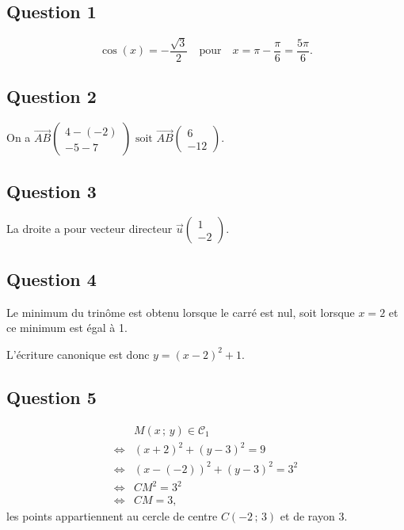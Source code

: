 \subsection*{Question 1}

\[
\cos(x) = -\dfrac{\sqrt{3}}{2} \quad \text{pour} \quad x = \pi - \dfrac{\pi}{6} = \dfrac{5\pi}{6}.
\]

\subsection*{Question 2}

On a \(\overrightarrow{AB} \begin{pmatrix} 4 - (-2) \\ -5 - 7 \end{pmatrix} \text{ soit } \overrightarrow{AB} \begin{pmatrix} 6 \\ -12 \end{pmatrix}\).

\subsection*{Question 3}

La droite a pour vecteur directeur \(\overrightarrow{u}\begin{pmatrix} 1 \\ -2 \end{pmatrix}\).

\subsection*{Question 4}

Le minimum du trinôme est obtenu lorsque le carré est nul, soit lorsque \( x = 2 \) et ce minimum est égal à 1.

L'écriture canonique est donc \( y = (x - 2)^2 + 1 \).

\subsection*{Question 5}

\begin{align*}
&M(x\,;\,y) \in \mathcal{C}_1 \\
\iff &(x + 2)^2 + (y - 3)^2 = 9 \\
\iff &(x - (-2))^2 + (y - 3)^2 = 3^2 \\
\iff &CM^2 = 3^2 \\
\iff &CM = 3,
\end{align*}
les points appartiennent au cercle de centre \( C(-2\,;\,3) \) et de rayon 3.

